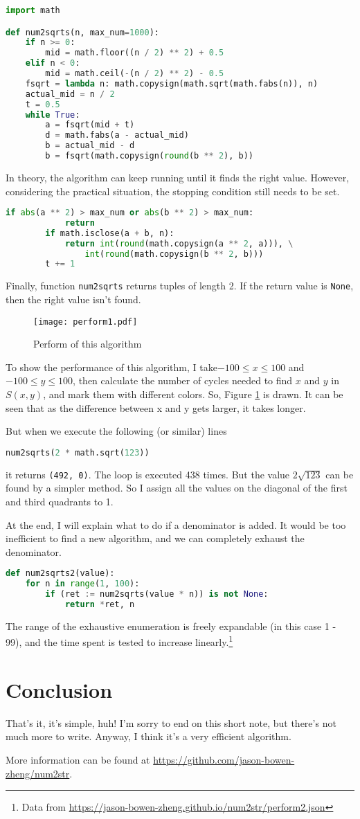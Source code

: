 \documentclass[a4paper]{article}
\begin{document}
\begin{lstlisting}[language=python, name=example1]
import math

def num2sqrts(n, max_num=1000):
	if n >= 0:
        mid = math.floor((n / 2) ** 2) + 0.5
    elif n < 0:
        mid = math.ceil(-(n / 2) ** 2) - 0.5
    fsqrt = lambda n: math.copysign(math.sqrt(math.fabs(n)), n)
    actual_mid = n / 2
    t = 0.5
    while True:
        a = fsqrt(mid + t)
        d = math.fabs(a - actual_mid)
        b = actual_mid - d
        b = fsqrt(math.copysign(round(b ** 2), b))
\end{lstlisting}
In theory, the algorithm can keep running until it finds the right value. However, considering the practical situation, the stopping condition still needs to be set.
\begin{lstlisting}[language=python, name=example1]
        if abs(a ** 2) > max_num or abs(b ** 2) > max_num:
            return
        if math.isclose(a + b, n):
            return int(round(math.copysign(a ** 2, a))), \
                int(round(math.copysign(b ** 2, b)))
        t += 1
\end{lstlisting}
Finally, function \verb|num2sqrts| returns tuples of length 2. If the return value is \verb|None|, then the right value isn't found.

\begin{figure}[htb]
    \centering
    \texttt{[image: perform1.pdf]}
    \caption{Perform of this algorithm}
    \label{fig:perform1}
\end{figure}

To show the performance of this algorithm, I take$-100\leq x\leq100$ and $-100\leq y\leq100$, then calculate the number of cycles needed to find $x$ and $y$ in $S(x,y)$, and mark them with different colors. So, Figure \ref{fig:perform1} is drawn. It can be seen that as the difference between x and y gets larger, it takes longer.

But when we execute the following (or similar) lines
\begin{lstlisting}[language=python]
num2sqrts(2 * math.sqrt(123))
\end{lstlisting}
it returns \verb|(492, 0)|. The loop is executed 438 times. But the value $2\sqrt{123}$ can be found by a simpler method. So I assign all the values on the diagonal of the first and third quadrants to 1.

At the end, I will explain what to do if a denominator is added. It would be too inefficient to find a new algorithm, and we can completely exhaust the denominator.
\begin{lstlisting}[language=python, name=example2]
def num2sqrts2(value):
    for n in range(1, 100):
        if (ret := num2sqrts(value * n)) is not None:
            return *ret, n
\end{lstlisting}
The range of the exhaustive enumeration is freely expandable (in this case 1 - 99), and the time spent is tested to increase linearly.\footnote{Data from \url{https://jason-bowen-zheng.github.io/num2str/perform2.json}}

\section{Conclusion}
That's it, it's simple, huh! I'm sorry to end on this short note, but there's not much more to write. Anyway, I think it's a very efficient algorithm.

More information can be found at \url{https://github.com/jason-bowen-zheng/num2str}.
\end{document}
